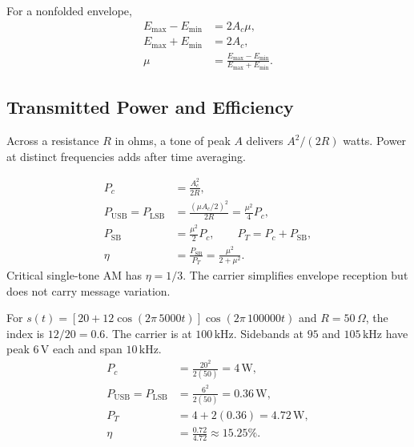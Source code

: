 \documentclass[12pt,a4paper]{article}
\begin{document}
\begin{tcolorbox}[tikzbox, unbreakable, title={Signed Envelope Factor at Three Modulation Depths}]
\centering
{}\par
\end{tcolorbox}

For a nonfolded envelope,
\[
\begin{aligned}
 E_{\max}-E_{\min}&=2A_c\mu,\\
 E_{\max}+E_{\min}&=2A_c,\\
 \mu&=\frac{E_{\max}-E_{\min}}{E_{\max}+E_{\min}}.
\end{aligned}
\]

\subsection{Transmitted Power and Efficiency}
Across a resistance $R$ in ohms, a tone of peak $A$ delivers $A^2/(2R)$ watts. Power at distinct frequencies adds after time averaging.
\begin{tcolorbox}[formulabox, title={Power of Single-Tone AM}]
\[
\begin{aligned}
 P_c &= \frac{A_c^2}{2R},\\
 P_{\mathrm{USB}}=P_{\mathrm{LSB}}&=\frac{(\mu A_c/2)^2}{2R}
                                  =\frac{\mu^2}{4}P_c,\\
 P_{\mathrm{SB}}&=\frac{\mu^2}{2}P_c,\qquad P_T=P_c+P_{\mathrm{SB}},\\
 \eta&=\frac{P_{\mathrm{SB}}}{P_T}=\frac{\mu^2}{2+\mu^2}.
\end{aligned}
\]
Critical single-tone AM has $\eta=1/3$. The carrier simplifies envelope reception but does not carry message variation.
\end{tcolorbox}

\begin{tcolorbox}[examplebox, title={Identify AM Frequencies and Calculate Power}]
For $s(t)=[20+12\cos(2\pi\,5000t)]\cos(2\pi\,100000t)$ and $R=50\,\Omega$, the index is $12/20=0.6$. The carrier is at $100\,\mathrm{kHz}$. Sidebands at $95$ and $105\,\mathrm{kHz}$ have peak $6\,\mathrm{V}$ each and span $10\,\mathrm{kHz}$.
\[
\begin{aligned}
 P_c&=\frac{20^2}{2(50)}=4\,\mathrm{W},\\
 P_{\mathrm{USB}}=P_{\mathrm{LSB}}&=\frac{6^2}{2(50)}=0.36\,\mathrm{W},\\
 P_T&=4+2(0.36)=4.72\,\mathrm{W},\\
 \eta&=\frac{0.72}{4.72}\approx15.25\%.
\end{aligned}
\]
\end{tcolorbox}
\end{document}
